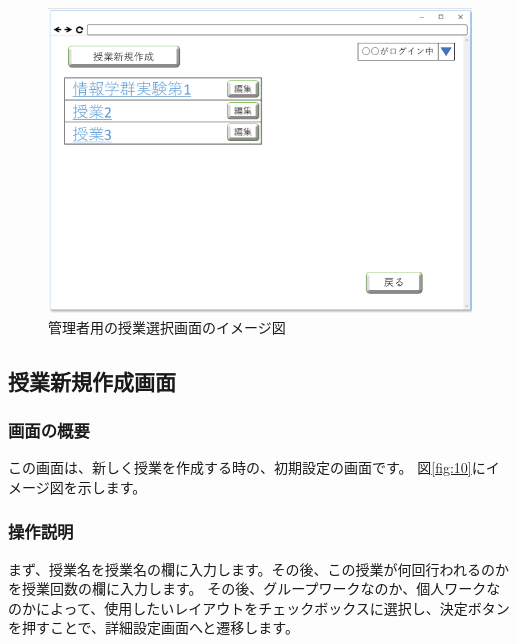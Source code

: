 \begin{figure}[htbp]
  \begin{center}
    \includegraphics[width=1\linewidth,clip]{./img/09.png}
    \caption{管理者用の授業選択画面のイメージ図}\label{fig:09}
  \end{center}
\end{figure}

\newpage

\subsection{授業新規作成画面}
\subsubsection{画面の概要}
この画面は、新しく授業を作成する時の、初期設定の画面です。
図\ref{fig:10}にイメージ図を示します。

\subsubsection{操作説明}
まず、授業名を授業名の欄に入力します。その後、この授業が何回行われるのかを授業回数の欄に入力します。
その後、グループワークなのか、個人ワークなのかによって、使用したいレイアウトをチェックボックスに選択し、決定ボタンを押すことで、詳細設定画面へと遷移します。

